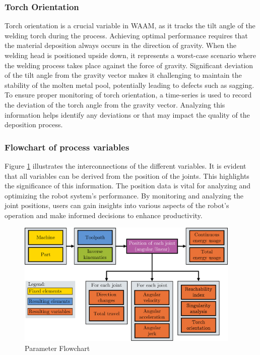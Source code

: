 \subsubsection*{Torch Orientation}
Torch orientation is a crucial variable in \acrshort{WAAM}, as it tracks the tilt angle of the welding torch during the process. Achieving optimal performance requires that the material deposition always occurs in the direction of gravity. When the welding head is positioned upside down, it represents a worst-case scenario where the welding process takes place against the force of gravity. Significant deviation of the tilt angle from the gravity vector makes it challenging to maintain the stability of the molten metal pool, potentially leading to defects such as sagging. To ensure proper monitoring of torch orientation, a time-series is used to record the deviation of the torch angle from the gravity vector. Analyzing this information helps identify any deviations or that may impact the quality of the deposition process.



\newpage
\subsubsection*{Flowchart of process variables}
Figure \ref{ParamsFlow} illustrates the interconnections of the different variables. It is evident that all variables can be derived from the position of the joints. This highlights the significance of this information. The position data is vital for analyzing and optimizing the robot system's performance. By monitoring and analyzing the joint positions, users can gain insights into various aspects of the robot's operation and make informed decisions to enhance productivity.


\begin{figure}[H]
	\centerline{\includegraphics[width=0.95\textwidth]{figures/Flow.png}}
	\caption{Parameter Flowchart}
	\label{ParamsFlow}
\end{figure}



